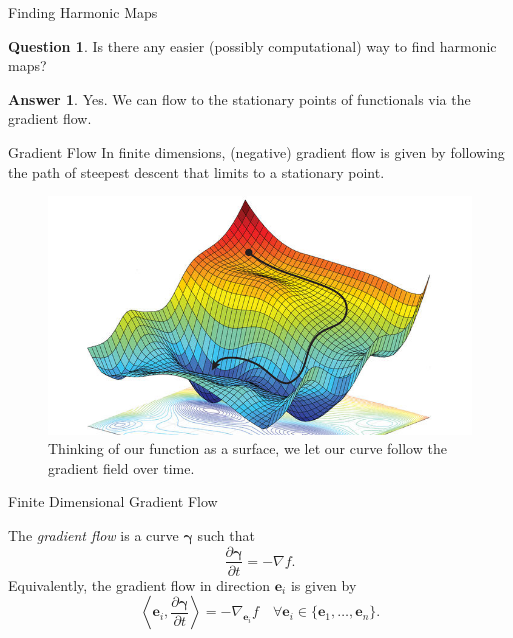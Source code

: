 \documentclass[usenames,dvipsnames]{beamer}
\theoremstyle{definition}
\newtheorem*{question}{Question}
\newtheorem*{answer}{Answer}
\theoremstyle{theorem}
\newcommand{\position}{\boldsymbol{\gamma}}
\begin{document}
        \begin{frame}{Finding Harmonic Maps}
            \begin{question}
                Is there any easier (possibly computational) way to find harmonic maps?
            \end{question}
            \pause
            \begin{answer}
                Yes.  We can flow to the stationary points of functionals via the gradient flow.
            \end{answer}
        \end{frame}
        
        \begin{frame}{Gradient Flow}
            In finite dimensions, (negative) gradient flow is given by following the path of steepest descent that limits to a stationary point.
            \begin{figure}[H]
                \centering
                \includegraphics[width=.6\textwidth]{images/gradient_descent_surface.jpg}
                \caption{Thinking of our function as a surface, we let our curve follow the gradient field over time.}
                \label{fig:gradient_flow_surface}
            \end{figure}
        \end{frame}
        
        \begin{frame}{Finite Dimensional Gradient Flow}
        
        \begin{definition}
        The \emph{gradient flow} is a curve $\boldsymbol{\gamma}$ such that
        \[
        \frac{\partial \boldsymbol\gamma}{\partial t} = -\nabla f.
        \]
        Equivalently, the gradient flow in direction $\mathbf{e}_i$ is given by
            \[
            \left\langle \mathbf{e}_i ,\frac{\partial \position}{\partial t}\right\rangle = -\nabla_{\mathbf{e}_i} f \quad \forall \mathbf{e}_i \in \{\mathbf{e}_1,\dots,\mathbf{e}_n\}.
            \]
        \end{definition}
        \end{frame}
        
\end{document}
